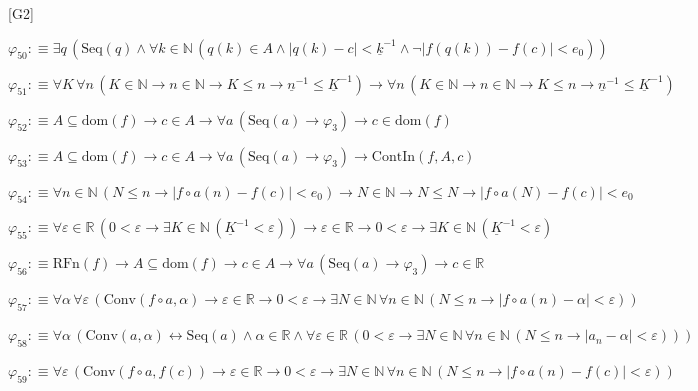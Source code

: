 \begin{fullproof}{[G2]}
\begin{abbrevlist}
\item $\varphi_{50} :\equiv \exists q\,(\mathrm{Seq}(q) \land \forall k \in \mathbb{N}\,(q(k) \in A \land \lvert q(k) - c \rvert < \underline{k}^{-1} \land \neg \lvert f(q(k)) - f(c) \rvert < e_{0}))$
\item $\varphi_{51} :\equiv \forall K\,\forall n\,(K \in \mathbb{N} \to n \in \mathbb{N} \to K \leq n \to \underline{n}^{-1} \leq \underline{K}^{-1}) \to \forall n\,(K \in \mathbb{N} \to n \in \mathbb{N} \to K \leq n \to \underline{n}^{-1} \leq \underline{K}^{-1})$
\item $\varphi_{52} :\equiv A \subseteq \mathrm{dom}(f) \to c \in A \to \forall a\,(\mathrm{Seq}(a) \to \varphi_{3}) \to c \in \mathrm{dom}(f)$
\item $\varphi_{53} :\equiv A \subseteq \mathrm{dom}(f) \to c \in A \to \forall a\,(\mathrm{Seq}(a) \to \varphi_{3}) \to \mathrm{ContIn}(f,A,c)$
\item $\varphi_{54} :\equiv \forall n \in \mathbb{N}\,(N \leq n \to \lvert f \circ a(n) - f(c) \rvert < e_{0}) \to N \in \mathbb{N} \to N \leq N \to \lvert f \circ a(N) - f(c) \rvert < e_{0}$
\item $\varphi_{55} :\equiv \forall \varepsilon \in \mathbb{R}\,(0 < \varepsilon \to \exists K \in \mathbb{N}\,(\underline{K}^{-1} < \varepsilon)) \to \varepsilon \in \mathbb{R} \to 0 < \varepsilon \to \exists K \in \mathbb{N}\,(\underline{K}^{-1} < \varepsilon)$
\item $\varphi_{56} :\equiv \mathrm{RFn}(f) \to A \subseteq \mathrm{dom}(f) \to c \in A \to \forall a\,(\mathrm{Seq}(a) \to \varphi_{3}) \to c \in \mathbb{R}$
\item $\varphi_{57} :\equiv \forall \alpha\,\forall \varepsilon\,(\mathrm{Conv}(f \circ a,\alpha) \to \varepsilon \in \mathbb{R} \to 0 < \varepsilon \to \exists N \in \mathbb{N}\,\forall n \in \mathbb{N}\,(N \leq n \to \lvert f \circ a(n) - \alpha \rvert < \varepsilon))$
\item $\varphi_{58} :\equiv \forall \alpha\,(\mathrm{Conv}(a,\alpha) \leftrightarrow \mathrm{Seq}(a) \land \alpha \in \mathbb{R} \land \forall \varepsilon \in \mathbb{R}\,(0 < \varepsilon \to \exists N \in \mathbb{N}\,\forall n \in \mathbb{N}\,(N \leq n \to \lvert a_{n} - \alpha \rvert < \varepsilon)))$
\item $\varphi_{59} :\equiv \forall \varepsilon\,(\mathrm{Conv}(f \circ a,f(c)) \to \varepsilon \in \mathbb{R} \to 0 < \varepsilon \to \exists N \in \mathbb{N}\,\forall n \in \mathbb{N}\,(N \leq n \to \lvert f \circ a(n) - f(c) \rvert < \varepsilon))$

\end{abbrevlist}
\end{fullproof}
